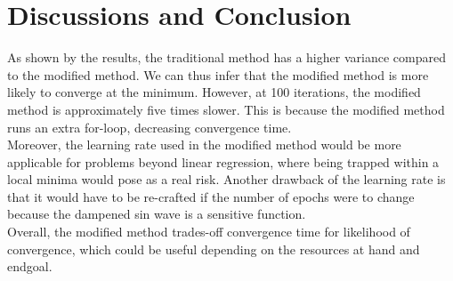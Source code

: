 \documentclass[onecolumn]{article}
\begin{document}
\newpage

\section{Discussions and Conclusion}

As shown by the results, the traditional method has a higher variance compared to the modified method. We can thus infer that the modified method is more likely to converge at the minimum. However, at 100 iterations, the modified method is approximately five times slower. This is because the modified method runs an extra for-loop, decreasing convergence time.\\ 

Moreover, the learning rate used in the modified method would be more applicable for problems beyond linear regression, where being trapped within a local minima would pose as a real risk. Another drawback of the learning rate is that it would have to be re-crafted if the number of epochs were to change because the dampened sin wave is a sensitive function.\\

Overall, the modified method trades-off convergence time for likelihood of convergence, which could be useful depending on the resources at hand and endgoal. 



\printbibliography
\end{document}
